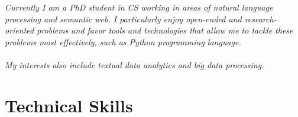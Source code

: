 \documentclass[11pt,a4paper]{moderncv}
\begin{document}
\maketitle

{\large\textit{Currently I am a PhD student in CS working in areas of natural language processing and semantic web.  I particularly enjoy open-ended and research-oriented problems and favor tools and technologies that allow me to tackle these problems most effectively, such as Python programming language.
\\\\
My interests also include textual data analytics and big data processing.}}
\vspace{0.5cm}

\section{Technical Skills}

\end{document}

